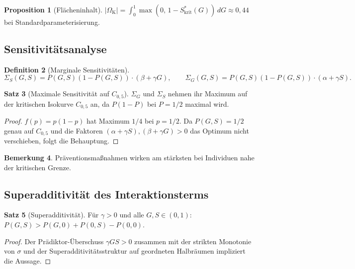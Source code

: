 ﻿\documentclass[12pt, a4paper]{article}
\theoremstyle{definition}
\newtheorem{definition}{Definition}[section]
\newtheorem{satz}[definition]{Satz}
\newtheorem{proposition}[definition]{Proposition}
\newtheorem{bemerkung}[definition]{Bemerkung}
\theoremstyle{remark}
\begin{document}
\begin{proposition}[Flächeninhalt]
\label{prop:flaeche}
$|\Omega_{\mathrm{K}}| = \int_0^1 \max(0,\, 1 - S^*_{\mathrm{krit}}(G))\,dG \approx 0{,}44$
bei Standardparameterisierung.
\end{proposition}

\subsection{Sensitivitätsanalyse}

\begin{definition}[Marginale Sensitivitäten]
\label{def:sensitivitaet}
\[
  \Sigma_S(G,S) = P(G,S)(1-P(G,S))\cdot(\beta+\gamma G),
  \qquad
  \Sigma_G(G,S) = P(G,S)(1-P(G,S))\cdot(\alpha+\gamma S).
\]
\end{definition}

\begin{satz}[Maximale Sensitivität auf $C_{0{,}5}$]
\label{satz:max_sensitivitaet}
$\Sigma_G$ und $\Sigma_S$ nehmen ihr Maximum auf der kritischen Isokurve $C_{0{,}5}$ an,
da $P(1-P)$ bei $P=1/2$ maximal wird.
\end{satz}

\begin{proof}
$f(p) = p(1-p)$ hat Maximum $1/4$ bei $p=1/2$. Da $P(G,S)=1/2$ genau auf $C_{0{,}5}$
und die Faktoren $(\alpha+\gamma S), (\beta+\gamma G) > 0$ das Optimum nicht verschieben,
folgt die Behauptung.
\end{proof}

\begin{bemerkung}
Präventionsmaßnahmen wirken am stärksten bei Individuen nahe der kritischen Grenze.
\end{bemerkung}

\subsection{Superadditivität des Interaktionsterms}

\begin{satz}[Superadditivität]
\label{satz:superadditivitaet}
Für $\gamma > 0$ und alle $G, S \in (0,1)$:
$P(G,S) > P(G,0) + P(0,S) - P(0,0)$.
\end{satz}

\begin{proof}
Der Prädiktor-Überschuss $\gamma GS > 0$ zusammen mit der strikten Monotonie
von $\sigma$ und der Superadditivitätsstruktur auf geordneten Halbräumen
impliziert die Aussage.
\end{proof}
\end{document}
